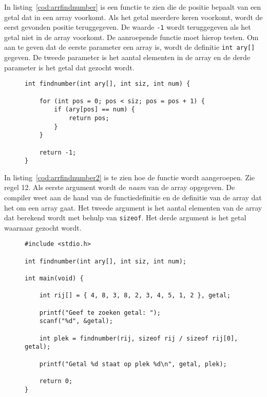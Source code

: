 In listing~\ref{cod:arrfindnumber} is een functie te zien die de positie bepaalt van een getal dat in een array voorkomt. Als het getal meerdere keren voorkomt, wordt de eerst gevonden positie teruggegeven. De waarde \texttt{-1} wordt teruggegeven als het getal niet in de array voorkomt. De aanroepende functie moet hierop testen. Om aan te geven dat de eerste parameter een array is, wordt de definitie \texttt{int ary[]} gegeven. De tweede parameter is het aantal elementen in de array en de derde parameter is het getal dat gezocht wordt.

\begin{figure}[H]
\begin{lstlisting}[caption=Functie voor het vinden van een getal in een array.,label=cod:arrfindnumber]
int findnumber(int ary[], int siz, int num) {

    for (int pos = 0; pos < siz; pos = pos + 1) {
        if (ary[pos] == num) {
            return pos;
        }
    }
    
    return -1;
}
\end{lstlisting}
\end{figure}

In listing~\ref{cod:arrfindnumber2} is te zien hoe de functie wordt aangeroepen. Zie regel 12. Als eerste argument wordt de \textsl{naam} van de array opgegeven. De compiler weet aan de hand van de functiedefinitie en de definitie van de array dat het om een array gaat. Het tweede argument is het aantal elementen van de array dat berekend wordt met behulp van  \texttt{sizeof}. Het derde argument is het getal waarnaar gezocht wordt.

\begin{figure}[!ht]
\begin{lstlisting}[caption=Aanroepen van de functie \texttt{findnumber}.,label=cod:arrfindnumber2]
#include <stdio.h>

int findnumber(int ary[], int siz, int num);

int main(void) {

    int rij[] = { 4, 8, 3, 8, 2, 3, 4, 5, 1, 2 }, getal;

    printf("Geef te zoeken getal: ");
    scanf("%d", &getal);
    
    int plek = findnumber(rij, sizeof rij / sizeof rij[0], getal);

    printf("Getal %d staat op plek %d\n", getal, plek);

    return 0;
}
\end{lstlisting}
\end{figure}

